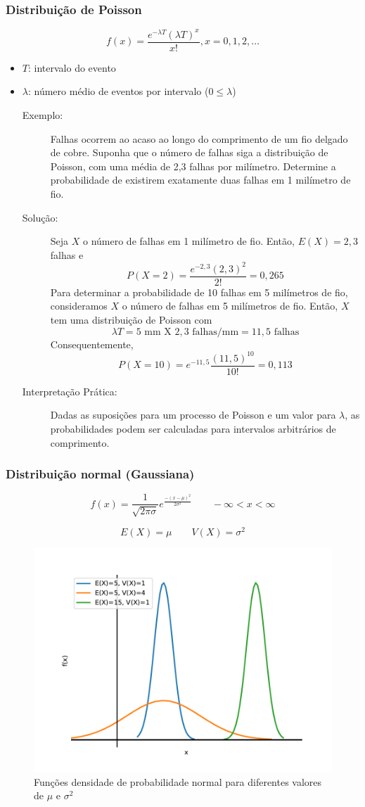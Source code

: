 \subsubsection{Distribuição de Poisson}
$$
f(x)=\frac{e^{-\lambda T}(\lambda T)^x}{x!}, x=0,1,2,\dots
$$
\begin{itemize}
	\item $T$: intervalo do evento
	\item $\lambda$: número médio de eventos por intervalo ($0\leq\lambda$)
	\begin{description}
		\item[Exemplo:] Falhas ocorrem ao acaso ao longo do comprimento de um fio delgado de cobre. Suponha que o número de falhas siga a distribuição de Poisson, com uma média de 2,3 falhas por milímetro. Determine a probabilidade de existirem exatamente duas falhas em 1 milímetro de fio.
		\item[Solução:] Seja $X$ o número de falhas em 1 milímetro de fio. Então, $E(X)=2,3$ falhas e
		$$P(X=2) = \frac{e^{-2,3}(2,3)^2}{2!}=0,265$$
		Para determinar a probabilidade de 10 falhas em 5 milímetros de fio, consideramos $X$ o número de falhas em 5 milímetros de fio. Então, $X$ tem uma distribuição de Poisson com
		$$\lambda T=5\text{ mm X }2,3\text{ falhas/mm}=11,5\text{ falhas}$$
		Consequentemente,
		$$P(X=10)=e^{-11,5}\frac{(11,5)^{10}}{10!}=0,113$$
		\item[Interpretação Prática:] Dadas as suposições para um processo de Poisson e um valor para $\lambda$, as probabilidades podem ser calculadas para intervalos arbitrários de comprimento.
	\end{description}
\end{itemize}

\subsubsection{Distribuição normal (Gaussiana)}
$$
f(x)=\frac{1}{\sqrt{2\pi\sigma}}e^{\frac{-(x-\mu)^2}{2\sigma^2}}\qquad-\infty<x<\infty
$$

$$
E(X)=\mu\qquad V(X)=\sigma^2
$$

\begin{figure}[htb!]
	\centering
	\caption{Funções densidade de probabilidade normal para diferentes valores de $\mu$ e $\sigma^2$}
	\label{fig:normal}
	\includegraphics[width=0.7\linewidth]{figs/normal}
\end{figure}


